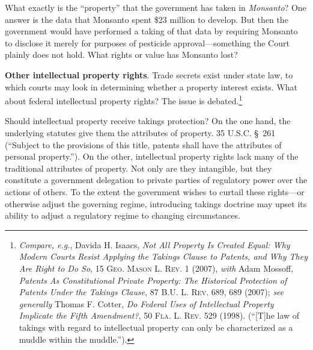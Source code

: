 

\item What exactly is the ``property'' that the government has taken in
\emph{Monsanto}? One answer is the data that Monsanto spent \$23 million to
develop. But then the government would have performed a taking of that data by
requiring
Monsanto to disclose it merely for purposes of pesticide approval---something
the Court plainly does not hold. What rights or value has Monsanto lost?


\item \textbf{Other intellectual property rights}.
Trade secrets exist under state law, to which courts may look in determining
whether a property interest exists. What about federal intellectual property
rights? The issue is
debated.\footnote{\textit{Compare, e.g.}, Davida H. Isaacs, \textit{Not All
Property Is Created Equal: Why Modern Courts Resist Applying the Takings Clause
to Patents, and Why They Are Right to Do So}, 15 \textsc{Geo. Mason L. Rev.} 1
(2007), \textit{with} Adam Mossoff, \textit{Patents As Constitutional Private
Property: The Historical Protection of Patents Under the Takings Clause}, 87
\textsc{B.U. L. Rev}. 689, 689 (2007); \textit{see generally} Thomas F. Cotter,
\textit{Do Federal Uses of Intellectual Property Implicate the Fifth
Amendment?}, 50 \textsc{Fla. L. Rev}. 529 (1998). (``[T]he law of takings with
regard to intellectual property can only be characterized as a muddle within the
muddle.'').}


Should intellectual property receive takings protection? On the one hand, the
underlying statutes give them the attributes of property. 35 U.S.C. \S~261
(``Subject to the provisions of this title, patents shall have the attributes of
personal property.''). On the other, intellectual property rights lack many of
the traditional
attributes of property. Not only are they intangible, but they constitute a
government delegation to private parties of regulatory power over the actions of
others. To the extent the government wishes to curtail these rights---or
otherwise adjust the governing regime, introducing takings doctrine may upset
its ability to adjust a regulatory regime to changing circumstances. 


